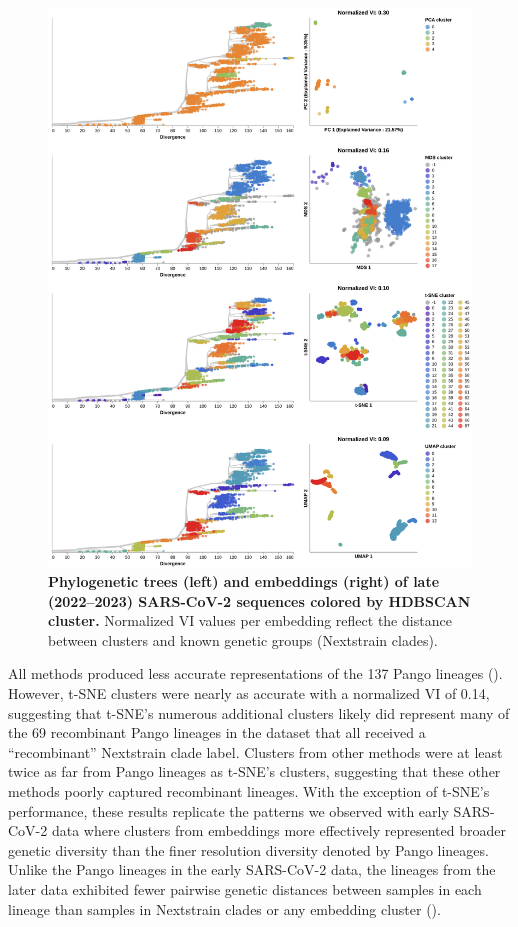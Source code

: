 \documentclass[10pt,letterpaper]{article}
\begin{document}
\begin{figure}[!h]
\includegraphics[width=\columnwidth]{figures/sarscov2-test-embeddings-by-cluster-vs-Nextstrain_clade.png}
\caption{{\bf Phylogenetic trees (left) and embeddings (right) of late (2022--2023) SARS-CoV-2 sequences colored by HDBSCAN cluster.}
  Normalized VI values per embedding reflect the distance between clusters and known genetic groups (Nextstrain clades).
}
\label{fig:sars-cov-2-2022-2023-clusters-vs-Nextstrain-clade}
\end{figure}

All methods produced less accurate representations of the 137 Pango lineages ().
However, t-SNE clusters were nearly as accurate with a normalized VI of 0.14, suggesting that t-SNE's numerous additional clusters likely did represent many of the 69 recombinant Pango lineages in the dataset that all received a ``recombinant'' Nextstrain clade label.
Clusters from other methods were at least twice as far from Pango lineages as t-SNE's clusters, suggesting that these other methods poorly captured recombinant lineages.
With the exception of t-SNE's performance, these results replicate the patterns we observed with early SARS-CoV-2 data where clusters from embeddings more effectively represented broader genetic diversity than the finer resolution diversity denoted by Pango lineages.
Unlike the Pango lineages in the early SARS-CoV-2 data, the lineages from the later data exhibited fewer pairwise genetic distances between samples in each lineage than samples in Nextstrain clades or any embedding cluster ().
\end{document}
